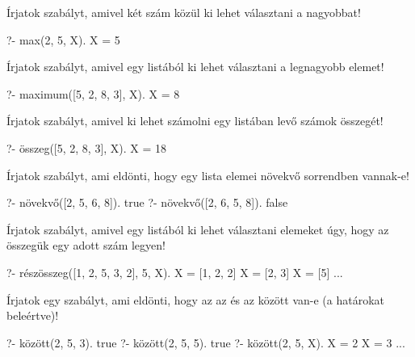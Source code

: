 \begin{problem}
\item Írjatok szabályt, amivel két szám közül ki
lehet választani a nagyobbat!
\begin{query}
?- max(2, 5, X).
X = 5
\end{query}
\end{problem}
\begin{problem}
\item Írjatok szabályt, amivel egy listából ki lehet
választani a legnagyobb elemet!
\begin{query}
?- maximum([5, 2, 8, 3], X).
X = 8
\end{query}
\end{problem}
\begin{problem}
\item Írjatok szabályt, amivel ki lehet számolni egy
listában levő számok összegét!
\begin{query}
?- összeg([5, 2, 8, 3], X).
X = 18
\end{query}
\end{problem}
\begin{problem}
\item Írjatok szabályt, ami eldönti, hogy egy lista
elemei növekvő sorrendben vannak-e!
\begin{query}
?- növekvő([2, 5, 6, 8]).
true
?- növekvő([2, 6, 5, 8]).
false
\end{query}
\end{problem}
\begin{problem}
\item Írjatok szabályt, amivel egy listából ki lehet
választani elemeket úgy, hogy az összegük egy
adott szám legyen!
\begin{query}
?- részösszeg([1, 2, 5, 3, 2], 5, X).
X = [1, 2, 2]
X = [2, 3]
X = [5]
...
\end{query}
\end{problem}
\begin{problem}
\item Írjatok egy  szabályt,
ami eldönti, hogy az  az  és az
 között van-e (a határokat beleértve)!
\begin{query}
?- között(2, 5, 3).
true
?- között(2, 5, 5).
true
?- között(2, 5, X).
X = 2
X = 3
...
\end{query}
\end{problem}

